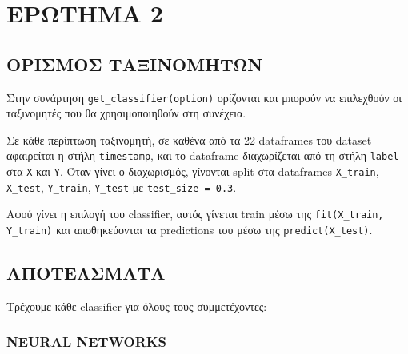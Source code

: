 \chapter{ΕΡΩΤΗΜΑ 2}

    \section{ΟΡΙΣΜΟΣ ΤΑΞΙΝΟΜΗΤΩΝ}

    Στην συνάρτηση \verb|get_classifier(option)| ορίζονται και μπορούν να επιλεχθούν οι ταξινομητές που θα χρησιμοποιηθούν στη συνέχεια.

    Σε κάθε περίπτωση ταξινομητή, σε καθένα από τα 22 dataframes του dataset αφαιρείται η στήλη \texttt{timestamp},
    και το dataframe διαχωρίζεται από τη στήλη \texttt{label} στα \texttt{X} και \texttt{Y}. Όταν γίνει ο διαχωρισμός, γίνονται split
    στα dataframes \texttt{X\_train}, \texttt{X\_test}, \texttt{Y\_train}, \texttt{Y\_test} με \verb|test_size = 0.3|.

    Αφού γίνει η επιλογή του classifier, αυτός γίνεται train μέσω της \verb|fit(X_train, Y_train)| και αποθηκεύονται τα predictions του μέσω της \verb|predict(X_test)|.

    \section{ΑΠΟΤΕΛΣΜΑΤΑ}

        Τρέχουμε κάθε classifier για όλους τους συμμετέχοντες:

    \subsection{NEURAL NETWORKS}

